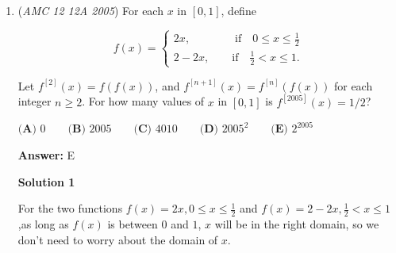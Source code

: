 \begin{enumerate}
 



\textbf{Solution 4}

We seek to find    the amount of numbers that contain at least one $4,$ and subtract this number from $2005.$ 

 We can simply apply casework to this problem.

 The amount of numbers with at least one $4$ that are one or two digit numbers are $4,14,24,34,40-49,54,\cdots,94$ which gives $19$ numbers.

 The amount of three digit numbers with at least one $4$ is $8*19+100=252.$ 

 The amount of four digit numbers with at least one $4$ is $252+1+19=272$

 This, our answer is $2005-19-252-272=1462,$ or $\boxed{B}.$




\textbf{Solution 5 (Super fast)}

This is very analogous to base $9$. But, in base $9$, we don't have a $9$. So, this means that these are equal except for that base 9 will be one more than the operation here. $2005_9 = 5+0+0+1458 = 1463$. $1463 - 1 = 1462$

 Therefore, our answer is $\boxed {1462}$



	\item (\textit{AMC 12 12A 2005}) For each $x$ in $[0,1]$, define


 
 \[f(x) = \begin{cases}  2x, \qquad\qquad \mathrm{if} \quad 0 \leq x \leq \frac{1}{2}\\  2-2x, \qquad \mathrm{if} \quad \frac{1}{2} < x \leq 1.  \end{cases}\]


 Let $f^{[2]}(x) = f(f(x))$, and $f^{[n + 1]}(x) = f^{[n]}(f(x))$ for each integer $n \geq 2$. For how many values of $x$ in $[0,1]$ is $f^{[2005]}(x) = 1/2$?


 $\textbf{(A) } 0 \qquad \textbf{(B) } 2005 \qquad \textbf{(C) } 4010 \qquad \textbf{(D) } 2005^2 \qquad \textbf{(E) } 2^{2005}$

 \textbf{Answer: }E



\textbf{Solution 1}

For the two functions $f(x)=2x,0\le x\le \frac{1}{2}$ and $f(x)=2-2x,\frac{1}{2}< x\le 1$,as long as $f(x)$ is between $0$ and $1$, $x$ will be in the right domain, so we don't need to worry about the domain of $x$.  


\end{enumerate}
